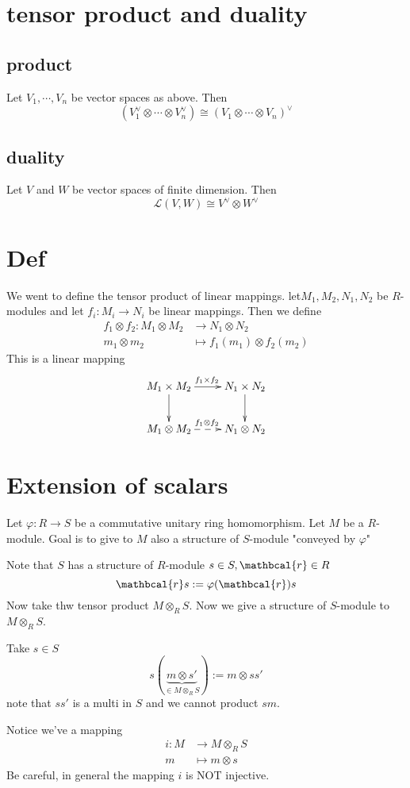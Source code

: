 \documentclass{book}
\begin{document}
\section{tensor product and duality}
\subsection{product}
Let $V_1,\cdots,V_n$ be vector spaces as above. Then $$(V_1^\vee\otimes\cdots\otimes V_n^\vee)\cong(V_1\otimes\cdots\otimes V_n)^\vee$$
\subsection{duality}
Let $V$ and $W$ be vector spaces of finite dimension. Then 
$$\mathscr{L}(V,W)\cong V^\vee\otimes W^\vee$$
\section{Def}
We went to define the tensor product of linear mappings. let$M_1,M_2,N_1,N_2$ be $R$-modules and let $f_i:M_i\rightarrow N_i$ be linear mappings. Then we define $$
\begin{aligned}
    f_1\otimes f_2:M_1\otimes M_2 &\rightarrow N_1\otimes N_2\\
    m_1\otimes m_2 &\mapsto f_1(m_1)\otimes f_2(m_2)
\end{aligned}
$$
This is a linear mapping
$$\xymatrix{
    M_1\times M_2\ar[d]\ar[r]^{f_1\times f_2}& N_1\times N_2\ar[d]\\
    M_1\otimes M_2 \ar@{-->}^{f_1\otimes f_2}[r] &N_1\otimes N_2
}$$
\section{Extension of scalars}
Let $\varphi:R\rightarrow S$ be a commutative unitary ring homomorphism. Let $M$ be a $R$-module. Goal is to give to $M$ also a structure of $S$-module "conveyed by $\varphi$"

Note that $S$ has a structure of $R$-module $s\in S,\mathbcal{r}\in R$$$\mathbcal{r}s:=\varphi(\mathbcal{r})s$$
Now take thw tensor product $M\otimes_RS$. Now we give a structure of $S$-module to $M\otimes_RS$. 

Take $s\in S$$$s(\underbrace{m\otimes s'}\limits_{\in M\otimes_RS}):=m\otimes ss'$$
note that $ss'$ is a multi in $S$ and we cannot product $sm$.

Notice we've a mapping
$$\begin{aligned}
    i: M&\rightarrow M\otimes_RS\\
    m &\mapsto m\otimes s
\end{aligned}$$
Be careful, in general the mapping $i$ is NOT injective.
\end{document}
